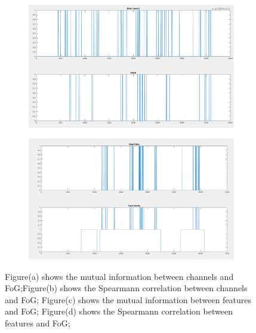 \documentclass[article]{article}
\begin{document}
   
    \lipsum[1]
 
    
    \begin{figure}
    \begin{center}
    	
    	\begin{subfigure}[b]{0.45\textwidth}
    		\centering
    		\includegraphics[width=\textwidth]{method1}
    		\caption{}
    		\label{fig:y equals x}
    	\end{subfigure}
    	\hfill
    	\begin{subfigure}[b]{0.45\textwidth}
    		\centering
    		\includegraphics[width=\textwidth]{method2}
    		\caption{}
    		\label{fig:y equals x}
    	\end{subfigure}
    	
    	
    	
    	\caption{Figure(a) shows the mutual information between channels and FoG;Figure(b) shows the Spearmann correlation between channels and FoG;
    		Figure(c) shows the mutual information between features and FoG;
    		Figure(d) shows the Spearmann correlation between features and FoG;}
    	\label{fig:three graphs}
 \end{center}	
   
 \end{figure}
    
\end{document}
